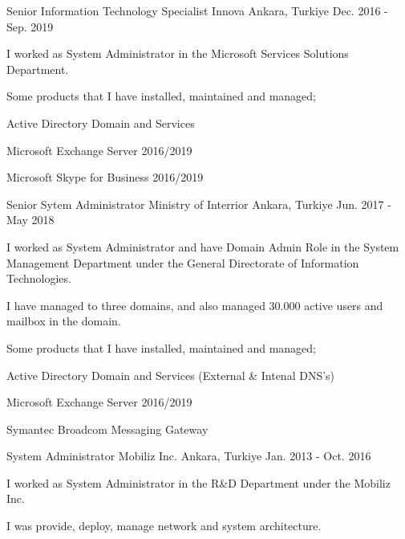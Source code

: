 \begin{cventries}
  \cventry
    {Senior Information Technology Specialist} %
    {Innova} %
    {Ankara, Turkiye} %
    {Dec. 2016 - Sep. 2019} %
    {
      \begin{cvitems} %
        \item {I worked as System Administrator in the Microsoft Services Solutions Department.}
        \item {Some products that I have installed, maintained and managed;}
        \item {Active Directory Domain and Services}
        \item {Microsoft Exchange Server 2016/2019}
        \item {Microsoft Skype for Business 2016/2019}
      \end{cvitems}
    }
  \cventry
    {Senior Sytem Administrator} %
    {Ministry of Interrior} %
    {Ankara, Turkiye} %
    {Jun. 2017 - May 2018} %
    {
      \begin{cvitems} %
        \item {I worked as System Administrator and have Domain Admin Role in the System Management Department under the General Directorate of Information Technologies.}
        \item {I have managed to three domains, and also managed 30.000 active users and mailbox in the domain.}
        \item {Some products that I have installed, maintained and managed;}
        \item {Active Directory Domain and Services (External \& Intenal DNS's)}
        \item {Microsoft Exchange Server 2016/2019}
        \item {Symantec Broadcom Messaging Gateway}
      \end{cvitems}
    }
  \cventry
    {System Administrator} %
    {Mobiliz Inc.} %
    {Ankara, Turkiye} %
    {Jan. 2013 - Oct. 2016} %
    {
      \begin{cvitems} %
        \item {I worked as System Administrator in the R\&D Department under the Mobiliz Inc.}
        \item {I was provide, deploy, manage network and system architecture.}

\end{cvitems}}
\end{cventries}
